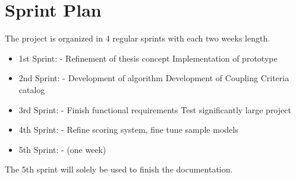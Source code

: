 \section{Sprint Plan}
\label{sec:projplan}

The project is organized in 4 regular sprints with each two weeks length. 

\begin{itemize}
\item 1st Sprint:  - 
\subitem Refinement of thesis concept
\subitem Implementation of prototype
\item 2nd Sprint:  - 
\subitem Development of algorithm
\subitem Development of Coupling Criteria catalog
\item 3rd Sprint:  - 
\subitem Finish functional requirements
\subitem Test significantly large project
\item 4th Sprint:  - 
\subitem Refine scoring system, fine tune sample models
\item 5th Sprint:  -  (one week)
\end{itemize}

The 5th sprint will solely be used to finish the documentation.

